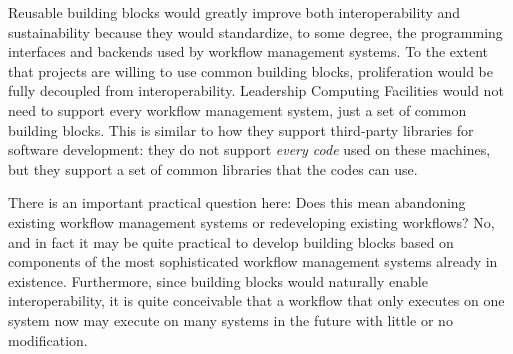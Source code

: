 Reusable building blocks would greatly improve both interoperability and
sustainability because they would standardize, to some degree, the programming
interfaces and backends used by workflow management systems. To the extent that
projects are willing to use common building blocks, proliferation would be fully
decoupled from interoperability. Leadership Computing Facilities would not need
to support every workflow management system, just a set of common building
blocks. This is similar to how they support third-party libraries for software
development: they do not support \textit{every code} used on these machines, but
they support a set of common libraries that the codes can use. 

There is an important practical question here: Does this mean abandoning
existing workflow management systems or redeveloping existing workflows? No, and
in fact it may be quite practical to develop building blocks based on components
of the most sophisticated workflow management systems already in existence.
Furthermore, since building blocks would naturally enable interoperability, it
is quite conceivable that a workflow that only executes on one system now may
execute on many systems in the future with little or no modification. 


